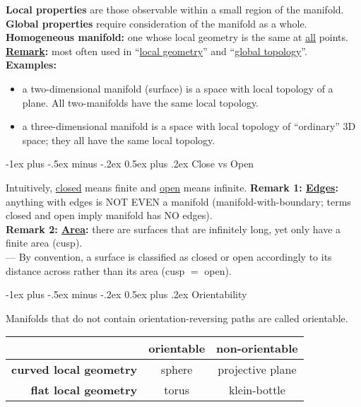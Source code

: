 \documentclass[10pt,landscape]{article}
\makeatletter
\renewcommand{\section}{\@startsection{section}{1}{0mm}%
                                {-1ex plus -.5ex minus -.2ex}%
                                {0.5ex plus .2ex}%
                                {\normalfont\large\bfseries}}
\makeatother
\begin{document}
\begin{multicols}{3}
{\bf Local properties} are those observable within a small region of the
manifold.\\
{\bf Global properties} require consideration of the manifold as a whole.\\
{\bf Homogeneous manifold:} one whose local geometry is the same at
\underline{all} points.\\
{\bf \underline{Remark}:} most often used in ``\underline{local geometry}'' and
``\underline{global topology}''.\\
{\bf Examples:}
\begin{itemize}
\item a two-dimensional manifold (surface) is a space with local topology of a
  plane. All two-manifolds have the same local topology.
\item a three-dimensional manifold is a space with local topology of
  ``ordinary'' 3D space; they all have the same local topology.
\end{itemize}


\section{Close vs Open}

Intuitively, \underline{closed} means finite and \underline{open} means
infinite.
{\bf Remark 1: \underline{Edges}:} anything with edges is NOT EVEN a manifold
(manifold-with-boundary; terms closed and open imply manifold has NO edges).\\
{\bf Remark 2: \underline{Area}:} there are surfaces that are infinitely long,
yet only have a finite area (cusp).\\
--- By convention, a surface is classified as closed or open accordingly to its
distance across rather than its area (cusp $=$ open).


\section{Orientability}

Manifolds that do not contain orientation-reversing paths are called orientable.
\begin{center}
  \begin{tabular}{r|c|c}
    & {\bf orientable} & {\bf non-orientable} \\\hline
    {\bf curved local geometry} & sphere & projective plane \\\hline
    {\bf flat local geometry} & torus & klein-bottle \\\hline
  \end{tabular}
\end{center}



\end{multicols}
\end{document}
